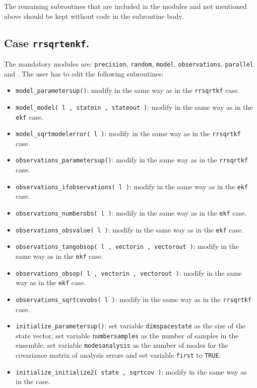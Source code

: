 \documentclass[12pt]{article}
\begin{document}
The remaining subroutines that are included in the modules and not mentioned above should be kept without code in the subroutine body.

\subsection{Case {\tt rrsqrtenkf}.} \label{subsection: case rrsqrtenkf}
The mandatory modules are: {\tt precision}, {\tt random}, {\tt model}, {\tt observations}, {\tt parallel} and . The user has to edit the following subroutines:
\begin{itemize}
\item {\tt model\_parametersup()}: modify in the same way as in the {\tt rrsqrtkf} case.
\item {\tt model\_model( l , statein , stateout )}: modify in the same way as in the {\tt ekf} case.
\item {\tt model\_sqrtmodelerror( l )}: modify in the same way as in the {\tt rrsqrtkf} case.
\item {\tt observations\_parametersup()}: modify in the same way as in the {\tt rrsqrtkf} case.
\item {\tt observations\_ifobservations( l )}: modify in the same way as in the {\tt ekf} case.
\item {\tt observations\_numberobs( l )}: modify in the same way as in the {\tt ekf} case.
\item {\tt observations\_obsvalue( l )}: modify in the same way as in the {\tt ekf} case.
\item {\tt observations\_tangobsop( l , vectorin , vectorout )}: modify in the same way as in the {\tt ekf} case.
\item {\tt observations\_obsop( l , vectorin , vectorout )}: modify in the same way as in the {\tt ekf} case.
\item {\tt observations\_sqrtcovobs( l )}: modify in the same way as in the {\tt rrsqrtkf} case.
\item {\tt initialize\_parametersup()}: set variable {\tt dimspacestate} as the size of the state vector, set variable {\tt numbersamples} as the number of samples in the ensemble, set variable {\tt modesanalysis} as the number of modes for the covariance matrix of analysis errors and set variable {\tt first} to {\tt TRUE}.
\item {\tt initialize\_initialize2( state , sqrtcov )}: modify in the same way as in the  case.
\end{itemize}
\end{document}

